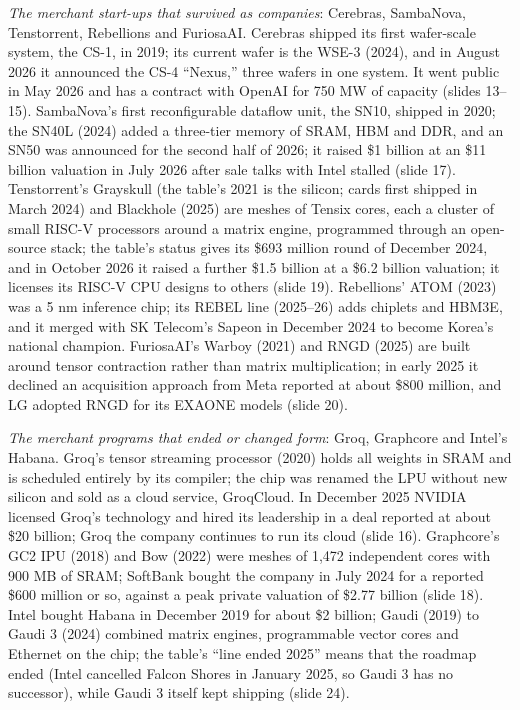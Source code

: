 \documentclass[11pt,letterpaper]{article}
\begin{document}
\emph{The merchant start-ups that survived as companies}: Cerebras, SambaNova, Tenstorrent, Rebellions and FuriosaAI. Cerebras shipped its first wafer-scale system, the CS-1, in 2019; its current wafer is the WSE-3 (2024), and in August 2026 it announced the CS-4 ``Nexus,'' three wafers in one system. It went public in May 2026 and has a contract with OpenAI for 750 MW of capacity (slides 13--15). SambaNova's first reconfigurable dataflow unit, the SN10, shipped in 2020; the SN40L (2024) added a three-tier memory of SRAM, HBM and DDR, and an SN50 was announced for the second half of 2026; it raised \$1 billion at an \$11 billion valuation in July 2026 after sale talks with Intel stalled (slide 17). Tenstorrent's Grayskull (the table's 2021 is the silicon; cards first shipped in March 2024) and Blackhole (2025) are meshes of Tensix cores, each a cluster of small RISC-V processors around a matrix engine, programmed through an open-source stack; the table's status gives its \$693 million round of December 2024, and in October 2026 it raised a further \$1.5 billion at a \$6.2 billion valuation; it licenses its RISC-V CPU designs to others (slide 19). Rebellions' ATOM (2023) was a 5 nm inference chip; its REBEL line (2025--26) adds chiplets and HBM3E, and it merged with SK Telecom's Sapeon in December 2024 to become Korea's national champion. FuriosaAI's Warboy (2021) and RNGD (2025) are built around tensor contraction rather than matrix multiplication; in early 2025 it declined an acquisition approach from Meta reported at about \$800 million, and LG adopted RNGD for its EXAONE models (slide 20).

\emph{The merchant programs that ended or changed form}: Groq, Graphcore and Intel's Habana. Groq's tensor streaming processor (2020) holds all weights in SRAM and is scheduled entirely by its compiler; the chip was renamed the LPU without new silicon and sold as a cloud service, GroqCloud. In December 2025 NVIDIA licensed Groq's technology and hired its leadership in a deal reported at about \$20 billion; Groq the company continues to run its cloud (slide 16). Graphcore's GC2 IPU (2018) and Bow (2022) were meshes of 1{,}472 independent cores with 900 MB of SRAM; SoftBank bought the company in July 2024 for a reported \$600 million or so, against a peak private valuation of \$2.77 billion (slide 18). Intel bought Habana in December 2019 for about \$2 billion; Gaudi (2019) to Gaudi 3 (2024) combined matrix engines, programmable vector cores and Ethernet on the chip; the table's ``line ended 2025'' means that the roadmap ended (Intel cancelled Falcon Shores in January 2025, so Gaudi 3 has no successor), while Gaudi 3 itself kept shipping (slide 24).
\end{document}
